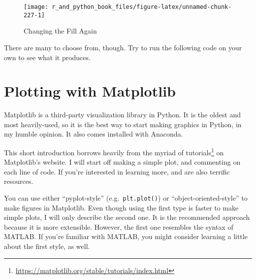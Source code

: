 \documentclass[12pt,krantz2]{krantz}
\makeatletter
\newenvironment{Shaded}{\begin{snugshade}}{\end{snugshade}}
\newcommand{\DataTypeTok}[1]{\textcolor[rgb]{0.27,0.27,0.27}{#1}}
\newcommand{\DecValTok}[1]{\textcolor[rgb]{0.06,0.06,0.06}{#1}}
\newcommand{\KeywordTok}[1]{\textcolor[rgb]{0.27,0.27,0.27}{\textbf{#1}}}
\newcommand{\NormalTok}[1]{#1}
\newcommand{\OperatorTok}[1]{\textcolor[rgb]{0.43,0.43,0.43}{\textbf{#1}}}
\newcommand{\StringTok}[1]{\textcolor[rgb]{0.5,0.5,0.5}{#1}}
\renewcommand{\href}[2]{#2\footnote{\url{#1}}}
\newenvironment{kframe}{%
\medskip{}
\setlength{\fboxsep}{.8em}
 \def\at@end@of@kframe{}%
 \ifinner\ifhmode%
  \def\at@end@of@kframe{\end{minipage}}%
  \begin{minipage}{\columnwidth}%
 \fi\fi%
 \def\FrameCommand##1{\hskip\@totalleftmargin \hskip-\fboxsep
 \colorbox{shadecolor}{##1}\hskip-\fboxsep
     \hskip-\linewidth \hskip-\@totalleftmargin \hskip\columnwidth}%
 \MakeFramed {\advance\hsize-\width
   \@totalleftmargin\z@ \linewidth\hsize
   \@setminipage}}%
 {\par\unskip\endMakeFramed%
 \at@end@of@kframe}
\renewenvironment{Shaded}{\begin{kframe}}{\end{kframe}}
\makeatother
\begin{document}
\begin{figure}

{\centering \texttt{[image: r\_and\_python\_book\_files/figure-latex/unnamed-chunk-227-1]} 

}

\caption{Changing the Fill Again}\label{fig:unnamed-chunk-227}
\end{figure}

There are many to choose from, though. Try to run the following code on your own to see what it produces.

\begin{Shaded}
\end{Shaded}

\hypertarget{plotting-with-matplotlib}{%
\section{Plotting with Matplotlib}\label{plotting-with-matplotlib}}

Matplotlib \citep{Hunter:2007} is a third-party visualization library in Python. It is the oldest and most heavily-used, so it is the best way to start making graphics in Python, in my humble opinion. It also comes installed with Anaconda.

This short introduction borrows heavily from the myriad of \href{https://matplotlib.org/stable/tutorials/index.html}{tutorials} on Matplotlib's website. I will start off making a simple plot, and commenting on each line of code. If you're interested in learning more, \citep{py_ds_handbook} and \citep{pandas_guy} are also terrific resources.

\begin{rmd-details}
You can use either ``pyplot-style'' (e.g.~\texttt{plt.plot()}) or ``object-oriented-style'' to make figures in Matplotlib. Even though using the first type is faster to make simple plots, I will only describe the second one. It is the recommended approach because it is more extensible. However, the first one resembles the syntax of MATLAB. If you're familiar with MATLAB, you might consider learning a little about the first style, as well.

\end{rmd-details}
\end{document}
